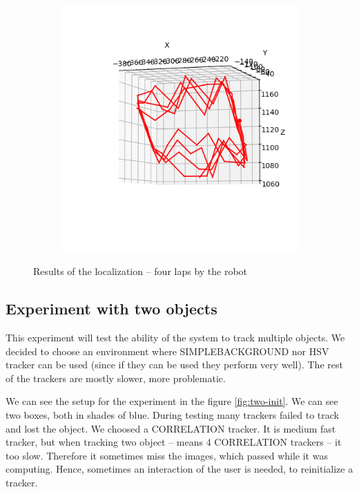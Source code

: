 \begin{figure}
\begin{subfigure}{0.48\linewidth}
	\includegraphics[width=\linewidth]{img/experiments/square-ugly.png}
\end{subfigure}
\caption{Results of the localization -- four laps by the robot}
\label{fig:square-results}
\end{figure}

\subsection{Experiment with two objects}

This experiment will test the ability of the system to track multiple objects.
We decided to choose an environment where SIMPLEBACKGROUND nor HSV tracker can
be used (since if they can be used they perform very well). The rest of the
trackers are mostly slower, more problematic.

We can see the setup for the experiment in the figure \ref{fig:two-init}. We
can see two boxes, both in shades of blue. During testing many trackers failed
to track and lost the object. We choosed a CORRELATION tracker. It is medium
fast tracker, but when tracking two object -- means 4 CORRELATION trackers --
it too slow. Therefore it sometimes miss the images, which passed while it was
computing. Hence, sometimes an interaction of the user is needed, to
reinitialize a tracker.

